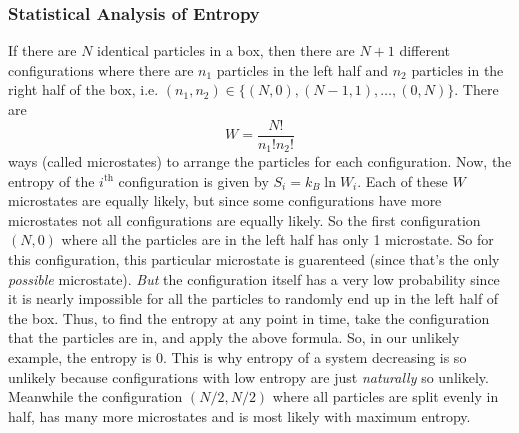 \documentclass{scrartcl}
\begin{document}
    \subsubsection{Statistical Analysis of Entropy}
    \quad If there are $N$ identical particles in a box, then there are $N+1$ different configurations where there are $n_1$ particles in the left half and $n_2$ particles in the right half of the box, i.e. $(n_1,n_2)\in\{(N,0),(N-1,1),\dots,(0,N)\}$. There are \[W=\frac{N!}{n_1!n_2!}\] ways (called microstates) to arrange the particles for each configuration. Now, the entropy of the $i^\text{th}$ configuration is given by $S_i=k_B\ln W_i$. Each of these $W$ microstates are equally likely, but since some configurations have more microstates not all configurations are equally likely. So the first configuration $(N,0)$ where all the particles are in the left half has only 1 microstate. So for this configuration, this particular microstate is guarenteed (since that's the only \textit{possible} microstate). \textit{But} the configuration itself has a very low probability since it is nearly impossible for all the particles to randomly end up in the left half of the box. Thus, to find the entropy at any point in time, take the configuration that the particles are in, and apply the above formula. So, in our unlikely example, the entropy is 0. This is why entropy of a system decreasing is so unlikely because configurations with low entropy are just \textit{naturally} so unlikely. Meanwhile the configuration $(N/2,N/2)$ where all particles are split evenly in half, has many more microstates and is most likely with maximum entropy.
\end{document}
